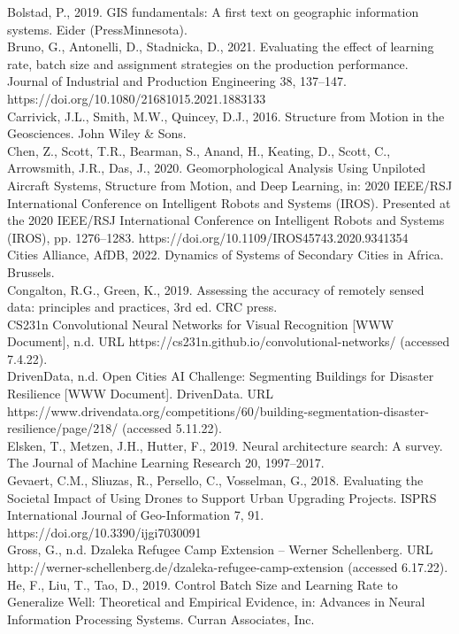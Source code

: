 \documentclass[11pt, a4paper, twoside]{report}
\begin{document}
Bolstad, P., 2019. GIS fundamentals: A first text on geographic information systems. Eider (PressMinnesota).\\
Bruno, G., Antonelli, D., Stadnicka, D., 2021. Evaluating the effect of learning rate, batch size and assignment strategies on the production performance. Journal of Industrial and Production Engineering 38, 137–147. https://doi.org/10.1080/21681015.2021.1883133\\
Carrivick, J.L., Smith, M.W., Quincey, D.J., 2016. Structure from Motion in the Geosciences. John Wiley & Sons.\\
Chen, Z., Scott, T.R., Bearman, S., Anand, H., Keating, D., Scott, C., Arrowsmith, J.R., Das, J., 2020. Geomorphological Analysis Using Unpiloted Aircraft Systems, Structure from Motion, and Deep Learning, in: 2020 IEEE/RSJ International Conference on Intelligent Robots and Systems (IROS). Presented at the 2020 IEEE/RSJ International Conference on Intelligent Robots and Systems (IROS), pp. 1276–1283. https://doi.org/10.1109/IROS45743.2020.9341354\\
Cities Alliance, AfDB, 2022. Dynamics of Systems of Secondary Cities in Africa. Brussels.\\
Congalton, R.G., Green, K., 2019. Assessing the accuracy of remotely sensed data: principles and practices, 3rd ed. CRC press.\\
CS231n Convolutional Neural Networks for Visual Recognition [WWW Document], n.d. URL https://cs231n.github.io/convolutional-networks/ (accessed 7.4.22).\\
DrivenData, n.d. Open Cities AI Challenge: Segmenting Buildings for Disaster Resilience [WWW Document]. DrivenData. URL https://www.drivendata.org/competitions/60/building-segmentation-disaster-resilience/page/218/ (accessed 5.11.22).\\
Elsken, T., Metzen, J.H., Hutter, F., 2019. Neural architecture search: A survey. The Journal of Machine Learning Research 20, 1997–2017.\\
Gevaert, C.M., Sliuzas, R., Persello, C., Vosselman, G., 2018. Evaluating the Societal Impact of Using Drones to Support Urban Upgrading Projects. ISPRS International Journal of Geo-Information 7, 91. https://doi.org/10.3390/ijgi7030091\\
Gross, G., n.d. Dzaleka Refugee Camp Extension – Werner Schellenberg. URL http://werner-schellenberg.de/dzaleka-refugee-camp-extension (accessed 6.17.22).\\
He, F., Liu, T., Tao, D., 2019. Control Batch Size and Learning Rate to Generalize Well: Theoretical and Empirical Evidence, in: Advances in Neural Information Processing Systems. Curran Associates, Inc.\\
\end{document}
